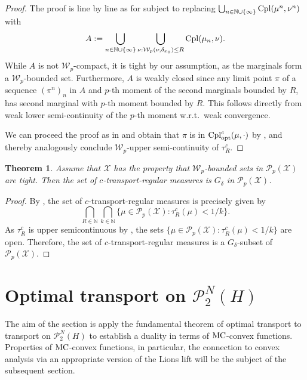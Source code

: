 \documentclass[a4paper]{amsart}
\newtheorem{theorem}{Theorem}
\numberwithin{theorem}{section}
\theoremstyle{definition}
\newcommand{\N}{\mathbb{N}}
\newcommand{\cpl}{\textup{Cpl}}
\newcommand{\W}{\mathcal{W}}
\newcommand{\Pc}{\mathcal P}
\newcommand{\cplopt}{\cpl_{\rm opt}}
\renewcommand{\H}{H}
\newcommand{\mc}{\textup{MC}}
\begin{document}
\begin{proof}
    The proof is line by line as for  subject to replacing $\bigcup_{n \in \N \cup \{\infty\}} \cpl(\mu^n,\nu^n)$ with 
    \[
        A := \bigcup_{n \in \N \cup \{ \infty \} } \bigcup_{\nu : \W_p(\nu,\delta_{x_0}) \le R} \cpl(\mu_n,\nu).
    \]
    While $A$ is not $\W_p$-compact, it is tight by our assumption, as the marginals form a $\mathcal W_p$-bounded set.
    Furthermore, $A$ is weakly closed since any limit point $\pi$ of a sequence $(\pi^n)_n$ in $A$ and $p$-th moment of the second marginals bounded by $R$, has second marginal with $p$-th moment bounded by $R$.
    This follows directly from weak lower semi-continuity of the $p$-th moment w.r.t.\ weak convergence.
    
    We can proceed the proof as in  and obtain that $\pi$ is in $\cplopt^c(\mu,\cdot)$ by \cite[Theorem 5.20]{Vi09}, and thereby analogously conclude $\W_p$-upper semi-continuity of $\tau^c_R$.
\end{proof}

\begin{theorem}\label{thm:TransportRegularPolish}
    Assume that $\mathcal X$ has the property that $\mathcal W_p$-bounded sets in $\Pc_p(\mathcal X)$ are tight.
    Then the set of $c$-transport-regular measures is $G_\delta$ in $\Pc_p(\mathcal X)$.
\end{theorem}

\begin{proof}
    By , the set of $c$-transport-regular measures is precisely given by
    \[
        \bigcap_{R \in \N} \bigcap_{k \in \N} \big\{ \mu \in \Pc_p(\mathcal X) : \tau_R^c(\mu) < 1/k \big\}.
    \]
    As $\tau_R^c$ is upper semicontinuous by , the sets $\{ \mu \in \Pc_p(\mathcal X) : \tau_R^c(\mu) < 1/k\}$ are open.
    Therefore, the set of $c$-transport-regular measures is a $G_\delta$-subset of $\Pc_p(\mathcal X)$.
\end{proof}


\section{Optimal transport on $\Pc_2^N(\H)$} \label{sec:OT_On_P_N}
The aim of the section is apply the fundamental theorem of optimal transport to transport on $\Pc_2^N(\H)$ to establish a duality in terms of $\mc$-convex functions. Properties of $\mc$-convex functions, in particular, the connection to convex analysis via an appropriate version of the Lions lift will be the subject of the subsequent section.
\end{document}
